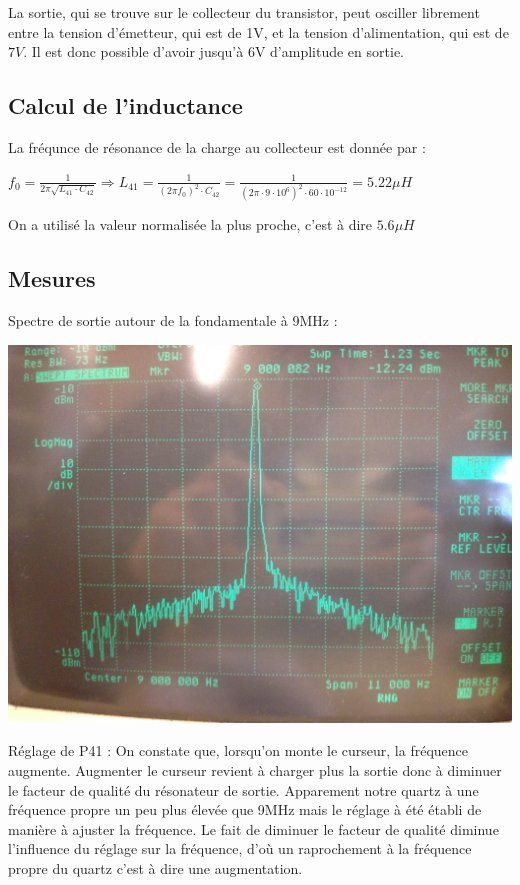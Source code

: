 \documentclass{article}
\begin{document}
La sortie, qui se trouve sur le collecteur du transistor, peut osciller librement entre la tension d'émetteur, qui est de 1V, et la tension d'alimentation, qui est de $7V$. Il est donc possible d'avoir jusqu'à 6V d'amplitude en sortie.\\

\subsection{Calcul de l'inductance}
La fréqunce de résonance de la charge au collecteur est donnée par :
\begin{center}
$f_0 = \frac{1}{2\pi \sqrt{L_{41} \cdot C_{42}}}
\Rightarrow
L_{41} = \frac{1}{(2\pi f_0)^2 \cdot C_{42}} = \frac{1}{(2\pi \cdot 9 \cdot 10^6)^2 \cdot 60 \cdot 10^{-12}} = 5.22 \mu H$
\end{center}
On a utilisé la valeur normalisée la plus proche, c'est à dire $5.6 \mu H$

\subsection{Mesures}
Spectre de sortie autour de la fondamentale à 9MHz :\\
\begin{center}
\includegraphics[width = 0.7\linewidth]{7_3_3_spectre9MHz.jpg}
\end{center}

Réglage de P41 : On constate que, lorsqu'on monte le curseur, la fréquence augmente. Augmenter le curseur revient à charger plus la sortie donc à diminuer le facteur de qualité du résonateur de sortie. Apparement notre quartz à une fréquence propre un peu plus élevée que 9MHz mais le réglage à été établi de manière à ajuster la fréquence. Le fait de diminuer le facteur de qualité diminue l'influence du réglage sur la fréquence, d'où un raprochement à la fréquence propre du quartz c'est à dire une augmentation.\\
\end{document}

